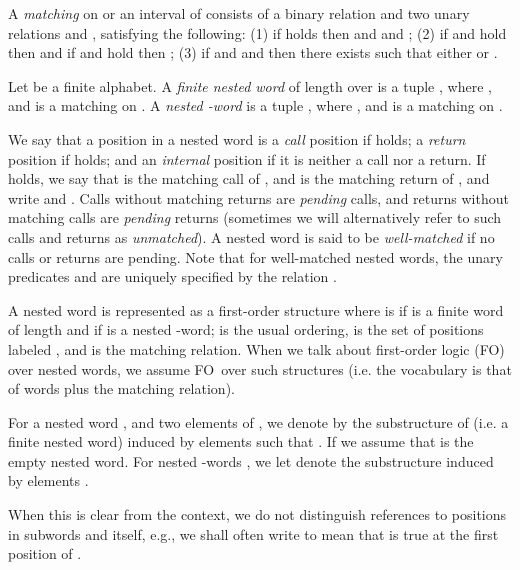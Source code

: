 \documentclass{LMCS}
\newcommand{\FO}{{\rm FO}}
\theoremstyle{plain}
\theoremstyle{definition}
\begin{document}
A {\em matching\/} on  or an interval  of 
consists of a binary relation  and two unary relations 
 and , satisfying the following: (1) if
 holds then  and  and ; 
(2) if  and  hold
then  and if  and  hold then ; 
(3) if  and  and  then
there exists  such that either  or .

Let  be a finite alphabet.  A {\em finite nested word} of
length  over  is a tuple , where
, and  is a matching on
.  A {\em nested -word} is a tuple
, where , and
 is a matching on .

We say that a position  in a nested word 
 is a {\em call} position if  holds;
a {\em return} position if  holds;
and an {\em internal} position if it is
neither a call nor a return.
If  holds, we say that  is the matching call of , and  is
the matching return of , and write  and . 
Calls without matching returns are {\em pending\/} calls, and returns without
matching calls are {\em pending\/} returns (sometimes we will
alternatively refer to such calls and returns as {\em unmatched}).
A nested word is said to be {\em well-matched\/} if no calls or returns are 
pending. Note that for well-matched nested words, the unary predicates
 and  are uniquely specified by the relation .

A nested word  is represented as a first-order structure
 where  is
 if  is a finite word of length  and  if
 is a nested -word;  is the usual ordering,  is
the set of positions labeled , and  is the matching
relation. When we talk about first-order logic (\FO) over nested words,
we assume \FO\ over such structures
 (i.e. the vocabulary is that of words plus the matching relation).

For a nested word , and two elements  of , we denote by
 the substructure of  (i.e. a finite nested word) induced
by elements  such that . If  we assume
that  is the empty nested word.
For nested -words , we let  denote the substructure
induced by elements .

When this is clear from the context, we do not 
distinguish references to positions in subwords  and 
itself, e.g., we shall often write  to mean
that  is true at the first position of .  
\end{document}
